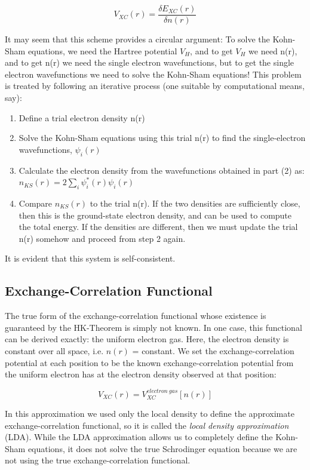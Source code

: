 \documentclass[]{article}
\begin{document}
\begin{equation}
V_{XC}(r) = \frac{\delta E_{XC}(r)}{\delta n(r)}
\end{equation}

It may seem that this scheme provides a circular argument: To solve the Kohn-Sham equations, we need the Hartree potential $V_H$, and to get $V_H$ we need n(r), and to get n(r) we need the single electron wavefunctions, but to get the single electron wavefunctions we need to solve the Kohn-Sham equations! This problem is treated by following an iterative process (one suitable by computational means, say):
\begin{enumerate}
	\item Define a trial electron density n(r)
	\item Solve the Kohn-Sham equations using this trial n(r) to find the single-electron wavefunctions, $\psi_{i}(r)$
	\item Calculate the electron density from the wavefunctions obtained in part (2) as: $n_{KS}(r) = 2\sum_{i}\psi_{i}^{*}(r)\psi_{i}(r)$
	\item Compare $n_{KS}(r)$ to the trial n(r). If the two densities are sufficiently close, then this is the ground-state electron density, and can be used to compute the total energy. If the densities are different, then we must update the trial n(r) somehow and proceed from step 2 again.
\end{enumerate}

It is evident that this system is self-consistent.


\subsection{Exchange-Correlation Functional}

The true form of the exchange-correlation functional whose existence is guaranteed by the HK-Theorem is simply not known. In one case, this functional can be derived exactly: the uniform electron gas. Here, the electron density is constant over all space, i.e. $n(r)$ = constant. We set the exchange-correlation potential at each position to be the known exchange-correlation potential from the uniform electron has at the electron density observed at that position:

\begin{equation}
V_{XC}(r) = V_{XC}^{electron \ gas}[n(r)]
\end{equation}

In this approximation we used only the local density to define the approximate exchange-correlation functional, so it is called the \textit{local density approximation} (LDA). While the LDA approximation allows us to completely define the Kohn-Sham equations, it does not solve the true Schrodinger equation because we are not using the true exchange-correlation functional.
\newline
\end{document}
